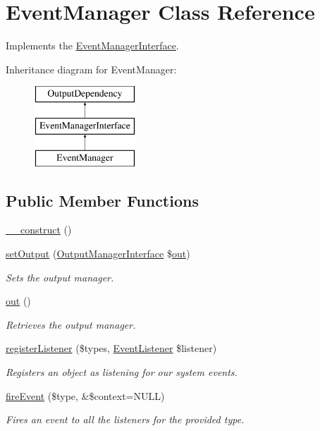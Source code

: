 \hypertarget{classEventManager}{\section{Event\-Manager Class Reference}
\label{classEventManager}
}


Implements the \hyperlink{interfaceEventManagerInterface}{Event\-Manager\-Interface}.  


Inheritance diagram for Event\-Manager\-:\begin{figure}[H]
\begin{center}
\leavevmode
\includegraphics[height=3.000000cm]{classEventManager}
\end{center}
\end{figure}
\subsection*{Public Member Functions}
\begin{DoxyCompactItemize}
\item 
\hyperlink{classEventManager_a5bd51c722bd90ea0e9dcb09cd9497155}{\-\_\-\-\_\-construct} ()
\item 
\hyperlink{classEventManager_ab75d670f0e0d69123495a08872126c13}{set\-Output} (\hyperlink{interfaceOutputManagerInterface}{Output\-Manager\-Interface} \$\hyperlink{classEventManager_ada57b61fe89a5325985c39a374dfc26d}{out})
\begin{DoxyCompactList}\small\item\em Sets the output manager. \end{DoxyCompactList}\item 
\hyperlink{classEventManager_ada57b61fe89a5325985c39a374dfc26d}{out} ()
\begin{DoxyCompactList}\small\item\em Retrieves the output manager. \end{DoxyCompactList}\item 
\hyperlink{classEventManager_a173cecd321289f65c8fd79d8d1240f69}{register\-Listener} (\$types, \hyperlink{interfaceEventListener}{Event\-Listener} \$listener)
\begin{DoxyCompactList}\small\item\em Registers an object as listening for our system events. \end{DoxyCompactList}\item 
\hyperlink{classEventManager_a1dd88102c578eb6a5e1f1ee927163f8e}{fire\-Event} (\$type, \&\$context=N\-U\-L\-L)
\begin{DoxyCompactList}\small\item\em Fires an event to all the listeners for the provided type. \end{DoxyCompactList}\end{DoxyCompactItemize}

